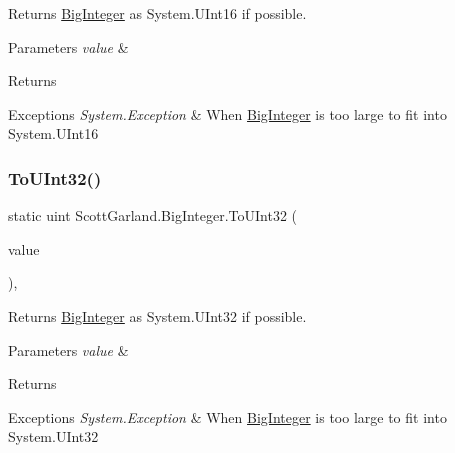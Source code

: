 Returns \hyperlink{class_scott_garland_1_1_big_integer}{Big\+Integer} as System.\+U\+Int16 if possible. 


\begin{DoxyParams}{Parameters}
{\em value} & \\
\hline
\end{DoxyParams}
\begin{DoxyReturn}{Returns}

\end{DoxyReturn}

\begin{DoxyExceptions}{Exceptions}
{\em System.\+Exception} & When \hyperlink{class_scott_garland_1_1_big_integer}{Big\+Integer} is too large to fit into System.\+U\+Int16\\
\hline
\end{DoxyExceptions}
\mbox{\label{class_scott_garland_1_1_big_integer_a89c18ca36b64bb368c7e96906a750537}} 
\subsubsection{\texorpdfstring{To\+U\+Int32()}{ToUInt32()}}
{\footnotesize\ttfamily static uint Scott\+Garland.\+Big\+Integer.\+To\+U\+Int32 (\begin{DoxyParamCaption}\item[{\hyperlink{class_scott_garland_1_1_big_integer}{Big\+Integer}}]{value }\end{DoxyParamCaption})\hspace{0.3cm}{\ttfamily [inline]}, {\ttfamily [static]}}



Returns \hyperlink{class_scott_garland_1_1_big_integer}{Big\+Integer} as System.\+U\+Int32 if possible. 


\begin{DoxyParams}{Parameters}
{\em value} & \\
\hline
\end{DoxyParams}
\begin{DoxyReturn}{Returns}

\end{DoxyReturn}

\begin{DoxyExceptions}{Exceptions}
{\em System.\+Exception} & When \hyperlink{class_scott_garland_1_1_big_integer}{Big\+Integer} is too large to fit into System.\+U\+Int32\\
\hline
\end{DoxyExceptions}
\mbox{\label{class_scott_garland_1_1_big_integer_a5b75b559d0c7ec75ff4eaceb1cdee2a4}} 
